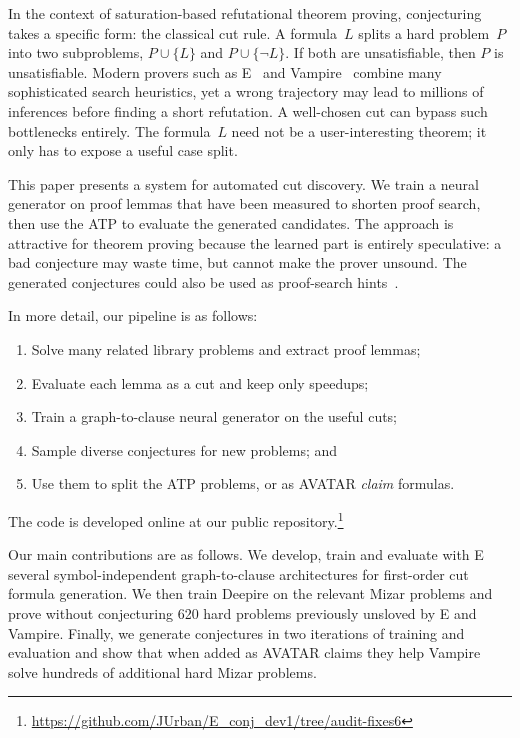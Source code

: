 \documentclass{easychair}
\newcommand{\Eprover}{E\xspace}
\newcommand{\Vampire}{Vampire\xspace}
\newcommand{\Mizar}{Mizar\xspace}
\newcommand{\ArtifactURL}{\textbf{[artifact URL to be inserted before submission]}}
\begin{document}
In the context of saturation-based refutational theorem proving, conjecturing takes
a specific form: the classical cut rule.  A formula~$L$ splits a hard 
problem~$P$ into two subproblems, $P\cup\{L\}$ and $P\cup\{\neg L\}$.
If both are unsatisfiable, then $P$ is unsatisfiable.  Modern provers
such as \Eprover~\cite{Schulz2002} and \Vampire~\cite{Kovacs2013}
combine many sophisticated search heuristics, yet a wrong
trajectory may lead to millions of inferences before finding a short
refutation.  A well-chosen cut can bypass such bottlenecks entirely.
The formula~$L$ need not be a user-interesting theorem; it only has to
expose a useful case split.

This paper presents a system for automated cut discovery.  We train a
neural generator on proof lemmas that have been measured
to shorten proof search, then use the ATP to evaluate the generated candidates.  The approach is attractive
for theorem proving because the learned part is entirely speculative:
a bad conjecture may waste time, but cannot make the prover unsound.
The generated conjectures could also be used as proof-search
hints~\cite{Veroff1996Hints}.

In more detail, our pipeline is as follows:
\begin{enumerate}\itemsep0pt
\item Solve many related library problems and extract proof lemmas;
\item Evaluate each lemma as a cut and keep only speedups;
\item Train a graph-to-clause neural generator on the useful cuts;
\item Sample diverse conjectures for new problems; and
\item Use them to split the ATP problems, or as AVATAR \emph{claim} formulas.
\end{enumerate}
The code is developed online at our public repository.\footnote{\url{https://github.com/JUrban/E_conj_dev1/tree/audit-fixes6}}


Our main contributions are as follows.  We develop, train and evaluate with E several
symbol-independent graph-to-clause architectures for first-order cut
formula generation.
We then train Deepire on the relevant Mizar problems and prove without conjecturing 620 hard problems previously unsloved by E and Vampire.
Finally, we generate conjectures in two iterations of training and evaluation
and show that when added as AVATAR claims they help \Vampire solve hundreds of additional
hard \Mizar problems.
\end{document}
